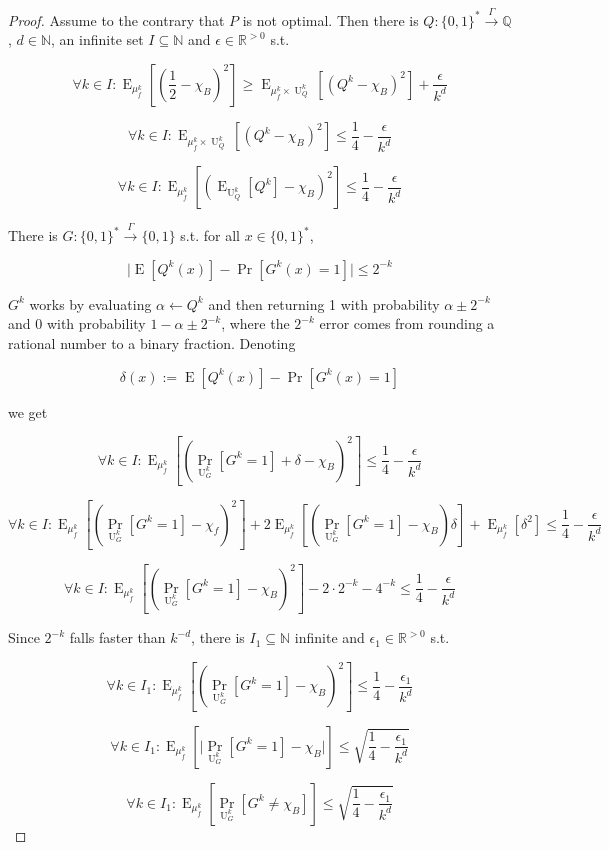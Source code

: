\documentclass{article}
\numberwithin{equation}{section}
\theoremstyle{definition}
\theoremstyle{plain}
\newcommand{\Bool}{\{0,1\}}
\newcommand{\Words}{{\Bool^*}}
\DeclareMathOperator{\Prb}{Pr}
\DeclareMathOperator{\E}{E}
\DeclareMathOperator{\Un}{U}
\newcommand{\Nats}{\mathbb{N}}
\newcommand{\Rats}{\mathbb{Q}}
\newcommand{\Reals}{\mathbb{R}}
\newcommand{\Abs}[1]{\lvert #1 \rvert}
\newcommand{\Scheme}{\xrightarrow{\Gamma}}
\begin{document}
\begin{proof}

Assume to the contrary that $P$ is not optimal. Then there is ${Q: \Words \Scheme \Rats}$, $d \in \Nats$, an infinite set ${I \subseteq \Nats}$ and $\epsilon \in \Reals^{>0}$ s.t.

$$ \forall k \in I: \E_{\mu_f^k}[(\frac{1}{2}-\chi_B)^2] \geq \E_{\mu_f^k \times \Un_Q^k}[(Q^k-\chi_B)^2] +\frac{\epsilon}{k^d}$$

$$ \forall k \in I: \E_{\mu_f^k \times \Un_Q^{k}}[(Q^{k}-\chi_B)^2] \leq \frac{1}{4} - \frac{\epsilon}{k^d} $$

$$ \forall k \in I: \E_{\mu_f^k}[(\E_{\Un_Q^{k}}[Q^{k}]-\chi_B)^2] \leq \frac{1}{4} - \frac{\epsilon}{k^d} $$

There is $G: \Words \xrightarrow{\Gamma} \Bool$ s.t. for all ${x \in \Words}$, 

\[\Abs{\E[Q^{k}(x)]-\Pr[G^k(x)=1]}\leq 2^{-k}\] 

$G^k$ works by evaluating ${\alpha \leftarrow Q^{k}}$ and then returning 1 with probability ${\alpha \pm 2^{-k}}$ and 0 with probability $1-\alpha \pm 2^{-k}$, where the $2^{-k}$ error comes from rounding a rational number to a binary fraction. Denoting 

\[\delta(x):=\E[Q^{k}(x)]-\Pr[G^k(x)=1]\]

we get

$$ \forall k \in I: \E_{\mu_f^k}[(\Prb_{\Un_G^k}[G^k=1]+\delta-\chi_B)^2] \leq \frac{1}{4} - \frac{\epsilon}{k^d} $$

$$ \forall k \in I: \E_{\mu_f^k}[(\Prb_{\Un_G^k}[G^k=1]-\chi_f)^2]+2 \E_{\mu_f^k}[(\Prb_{\Un_G^k}[G^k=1]-\chi_B)\delta]+\E_{\mu_f^k}[\delta^2] \leq \frac{1}{4} - \frac{\epsilon}{k^d}$$

$$ \forall k \in I: \E_{\mu_f^k}[(\Prb_{\Un_G^k}[G^k=1]-\chi_B)^2]-2 \cdot 2^{-k}- 4^{-k} \leq \frac{1}{4} - \frac{\epsilon}{k^d}$$

Since $2^{-k}$ falls faster than $k^{-d}$, there is $I_1 \subseteq \Nats$ infinite and $\epsilon_1 \in \Reals^{>0}$ s.t.

$$ \forall k \in I_1: \E_{\mu_f^k}[(\Prb_{\Un_G^k}[G^k=1]-\chi_B)^2] \leq \frac{1}{4} - \frac{\epsilon_1}{k^d}$$

$$ \forall k \in I_1: \E_{\mu_f^k}[\Abs{\Prb_{\Un_G^k}[G^k=1]-\chi_B}] \leq \sqrt{\frac{1}{4} - \frac{\epsilon_1}{k^d}} $$

$$ \forall k \in I_1: \E_{\mu_f^k}[\Prb_{\Un_G^k}[G^k \ne \chi_B]] \leq \sqrt{\frac{1}{4} - \frac{\epsilon_1}{k^d}} $$


\end{proof}
\end{document}
